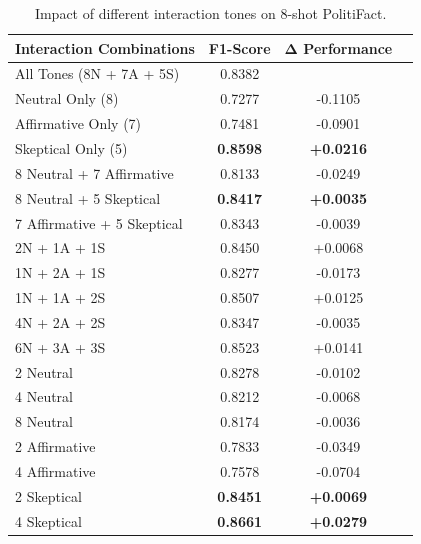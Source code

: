 \begin{table}[htbp]
\centering
\caption{Impact of different interaction tones on 8-shot PolitiFact.}
\label{tab:ablation_tones_politifact}
\begin{tabular}{lccc}
\toprule
\textbf{Interaction Combinations} & \textbf{F1-Score} & \textbf{Δ Performance} \\
\midrule
All Tones (8N + 7A + 5S) & 0.8382 & \- \\
\midrule
Neutral Only (8) & 0.7277 & -0.1105 \\
Affirmative Only (7) & 0.7481 & -0.0901 \\
Skeptical Only (5) & \textbf{0.8598} & \textbf{+0.0216} \\
\midrule
8 Neutral + 7 Affirmative & 0.8133 & -0.0249 \\
8 Neutral + 5 Skeptical & \textbf{0.8417} & \textbf{+0.0035} \\
7 Affirmative + 5 Skeptical & 0.8343 & -0.0039 \\
\midrule
2N + 1A + 1S & 0.8450 & +0.0068 \\
1N + 2A + 1S & 0.8277 & -0.0173 \\
1N + 1A + 2S & 0.8507 & +0.0125 \\
\midrule
4N + 2A + 2S & 0.8347 & -0.0035 \\
6N + 3A + 3S & 0.8523 & +0.0141 \\
\midrule
2 Neutral     & 0.8278 & -0.0102 \\
4 Neutral     & 0.8212 & -0.0068 \\
8 Neutral     & 0.8174 & -0.0036 \\ 
2 Affirmative & 0.7833 & -0.0349 \\
4 Affirmative & 0.7578 & -0.0704 \\
2 Skeptical   & \textbf{0.8451} & \textbf{+0.0069} \\
4 Skeptical   & \textbf{0.8661} & \textbf{+0.0279} \\
\bottomrule
\end{tabular}
\end{table}


